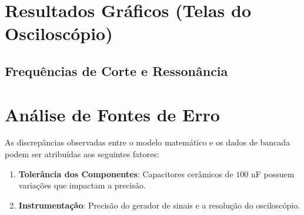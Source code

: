 \section{Resultados Gráficos (Telas do Osciloscópio)}

\subsection{Frequências de Corte e Ressonância}


\section{Análise de Fontes de Erro}

As discrepâncias observadas entre o modelo matemático e os dados de bancada podem ser atribuídas aos seguintes fatores:

\begin{enumerate}
	\item \textbf{Tolerância dos Componentes}: Capacitores cerâmicos de $100$ nF possuem variações que impactam a precisão.
	\item \textbf{Instrumentação}: Precisão do gerador de sinais e a resolução do osciloscópio.
\end{enumerate}